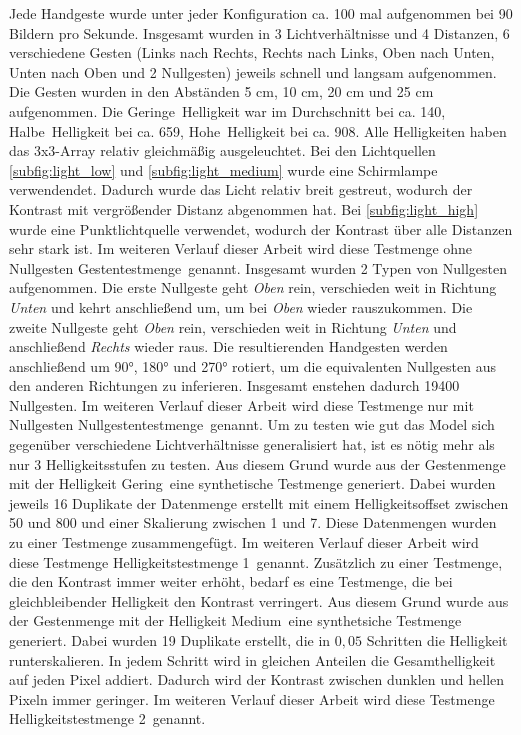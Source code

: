 Jede Handgeste wurde unter jeder Konfiguration ca. 100 mal aufgenommen bei 90 Bildern pro Sekunde. Insgesamt wurden in 3 Lichtverhältnisse und 4 Distanzen, 6 verschiedene Gesten (Links nach Rechts,
Rechts nach Links, Oben nach Unten, Unten nach Oben und 2 Nullgesten) jeweils schnell und langsam aufgenommen. Die Gesten wurden in den Abständen 5 cm, 10 cm, 20 cm und 25 cm aufgenommen.
\newline
\newline
Die \glqq Geringe\grqq\ Helligkeit war im Durchschnitt bei ca. 140, \glqq Halbe\grqq\ Helligkeit bei ca. 659, \glqq Hohe\grqq\ Helligkeit bei ca. 908. Alle Helligkeiten haben das 3x3-Array
relativ gleichmäßig ausgeleuchtet. Bei den Lichtquellen \ref{subfig:light_low} und \ref{subfig:light_medium} wurde eine Schirmlampe verwendendet. Dadurch wurde das Licht relativ breit gestreut,
wodurch der Kontrast mit vergrößender Distanz abgenommen hat. Bei \ref{subfig:light_high} wurde eine Punktlichtquelle verwendet, wodurch der Kontrast über alle Distanzen sehr stark ist.
Im weiteren Verlauf dieser Arbeit wird diese Testmenge ohne Nullgesten \glqq Gestentestmenge\grqq\ genannt.
\newline
\newline
Insgesamt wurden 2 Typen von Nullgesten aufgenommen. Die erste Nullgeste geht \textit{Oben} rein, verschieden weit in Richtung \textit{Unten} und kehrt anschließend um, um bei \textit{Oben} wieder rauszukommen.
Die zweite Nullgeste geht \textit{Oben} rein, verschieden weit in Richtung \textit{Unten} und anschließend \textit{Rechts} wieder raus. Die resultierenden Handgesten werden anschließend um 90°, 180° und
270° rotiert, um die equivalenten Nullgesten aus den anderen Richtungen zu inferieren. Insgesamt enstehen dadurch 19400 Nullgesten. Im weiteren Verlauf dieser Arbeit wird diese Testmenge nur
mit Nullgesten \glqq Nullgestentestmenge\grqq\ genannt.
\newline
\newline
Um zu testen wie gut das Model sich gegenüber verschiedene Lichtverhältnisse generalisiert hat, ist es nötig mehr als nur 3 Helligkeitsstufen zu testen. Aus diesem Grund wurde aus der Gestenmenge mit
der Helligkeit \glqq Gering\grqq\ eine synthetische Testmenge generiert. Dabei wurden jeweils 16 Duplikate der Datenmenge erstellt mit einem Helligkeitsoffset zwischen 50 und 800 und einer
Skalierung zwischen 1 und 7. Diese Datenmengen wurden zu einer Testmenge zusammengefügt. Im weiteren Verlauf dieser Arbeit wird diese Testmenge \glqq Helligkeitstestmenge 1\grqq\ genannt.
\newline
\newline
Zusätzlich zu einer Testmenge, die den Kontrast immer weiter erhöht, bedarf es eine Testmenge, die bei gleichbleibender Helligkeit den Kontrast verringert. Aus diesem Grund wurde aus der Gestenmenge mit
der Helligkeit \glqq Medium\grqq\ eine synthetsiche Testmenge generiert. Dabei wurden 19 Duplikate erstellt, die in $0,05$ Schritten die Helligkeit runterskalieren. In jedem Schritt wird in gleichen
Anteilen die Gesamthelligkeit auf jeden Pixel addiert. Dadurch wird der Kontrast zwischen dunklen und hellen Pixeln immer geringer.  Im weiteren Verlauf dieser Arbeit wird diese Testmenge
\glqq Helligkeitstestmenge 2\grqq\ genannt.